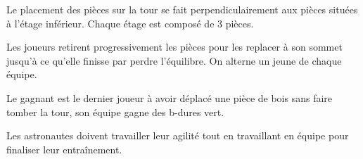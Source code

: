 \documentclass{grand-jeu}
\begin{document}
\begin{liste-materiel}
\end{liste-materiel}

\begin{regles}
Le placement des pièces sur la tour se fait perpendiculairement aux pièces situées à l'étage inférieur. Chaque étage est composé de 3 pièces.

Les joueurs retirent progressivement les pièces pour les replacer à son sommet jusqu'à ce qu'elle finisse par perdre l'équilibre. On alterne un jeune de chaque équipe.

Le gagnant est le dernier joueur à avoir déplacé une pièce de bois sans faire tomber la tour, son équipe gagne des b-dures vert.
\end{regles}

\begin{imaginaire}
Les astronautes doivent travailler leur agilité tout en travaillant en équipe pour finaliser leur entraînement. 
\end{imaginaire}

\begin{moments-stop}
\end{moments-stop}
\end{document}
